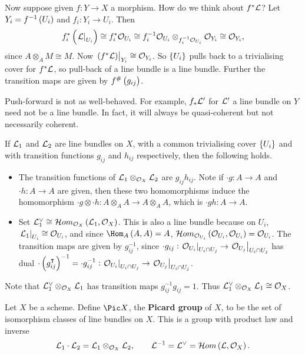 Now suppose given $ f : Y \to X $ a morphism. How do we think about $ f^*\mathcal{L} $? Let $ Y_i = f^{-1}\br{U_i} $ and $ f_i : Y_i \to U_i $. Then
$$ f_i^*\br{\eval{\LLL}_{U_i}} \cong f_i^*\OOO_{U_i} \cong f_i^{-1}\OOO_{U_i} \otimes_{f_i^{-1}\OOO_{U_i}} \OOO_{Y_i} \cong \OOO_{Y_i}, $$
since $ A \otimes_A M \cong M $. Now $ \eval{\br{f^*\LLL}}_{Y_i} \cong \OOO_{Y_i} $. So $ \cbr{U_i} $ pulls back to a trivialising cover for $ f^*\mathcal{L} $, so pull-back of a line bundle is a line bundle. Further the transition maps are given by $ f^\#\br{g_{ij}} $.

\begin{remark*}
Push-forward is not as well-behaved. For example, $ f_*\mathcal{L}' $ for $ \mathcal{L}' $ a line bundle on $ Y $ need not be a line bundle. In fact, it will always be quasi-coherent but not necessarily coherent.
\end{remark*}

If $ \mathcal{L}_1 $ and $ \mathcal{L}_2 $ are line bundles on $ X $, with a common trivialising cover $ \cbr{U_i} $ and with transition functions $ g_{ij} $ and $ h_{ij} $ respectively, then the following holds.
\begin{itemize}
\item The transition functions of $ \mathcal{L}_1 \otimes_{\mathcal{O}_X} \mathcal{L}_2 $ are $ g_{ij}h_{ij} $. Note if $ \cdot g : A \to A $ and $ \cdot h : A \to A $ are given, then these two homomorphisms induce the homomorphism $ \cdot g \otimes \cdot h : A \otimes_A A \to A \otimes_A A $, which is $ \cdot gh : A \to A $.
\item Set $ \LLL_1^\vee \cong \HOM_{\OOO_X}\br{\LLL_1, \OOO_X} $. This is also a line bundle because on $ U_i $, $ \left. \mathcal{L}_1 \right|_{U_i} \cong \mathcal{O}_{U_i} $, and since $ \Hom_A\br{A, A} = A $, $ \HOM_{\OOO_{U_i}}\br{\OOO_{U_i}, \OOO_{U_i}} = \OOO_{U_i} $. The transition maps are given by $ g_{ij}^{-1} $, since $ \cdot g_{ij} : \left. \mathcal{O}_{U_i} \right|_{U_i \cap U_j} \to \left. \mathcal{O}_{U_j} \right|_{U_i \cap U_j} $ has dual $ \cdot \br{g_{ij}^\intercal}^{-1} = \cdot g_{ij}^{-1} : \eval{\OOO_{U_i}}_{U_i \cap U_j} \to \eval{\OOO_{U_j}}_{U_i \cap U_j} $.
\end{itemize}
Note that $ \mathcal{L}_1^\vee \otimes_{\mathcal{O}_X} \mathcal{L}_1 $ has transition maps $ g_{ij}^{-1}g_{ij} = 1 $. Thus $ \mathcal{L}_1^\vee \otimes_{\mathcal{O}_X} \mathcal{L}_1 \cong \mathcal{O}_X $.

\begin{definition*}
Let $ X $ be a scheme. Define $ \Pic X $, the \textbf{Picard group} of $ X $, to be the set of isomorphism classes of line bundles on $ X $. This is a group with product law and inverse
$$ \LLL_1 \cdot \LLL_2 = \LLL_1 \otimes_{\OOO_X} \LLL_2, \qquad \LLL^{-1} = \LLL^\vee = \HOM\br{\LLL, \OOO_X}. $$
\end{definition*}

